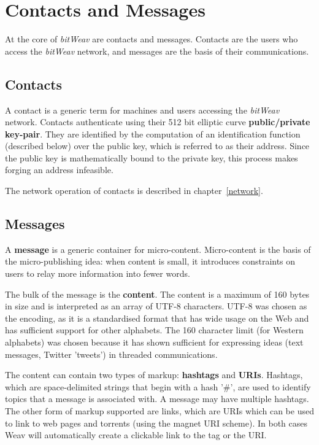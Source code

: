 \documentclass[10pt,a4paper,onecolumn]{article}
\begin{document}
\section{Contacts and Messages}
\label{ContactsAndMessages}
At the core of \textit{bitWeav} are contacts and messages. Contacts are the users who access the \textit{bitWeav} network, and messages are the basis of their communications.

\subsection*{Contacts}
A contact is a generic term for machines and users accessing the \textit{bitWeav} network. Contacts authenticate using their 512 bit elliptic curve \textbf{public/private key-pair}. They are identified by the computation of an identification function (described below) over the public key, which is referred to as their address. Since the public key is mathematically bound to the private key, this process makes forging an address infeasible.

The network operation of contacts is described in chapter~\ref{network}.

\subsection*{Messages}
A \textbf{message} is a generic container for micro-content. Micro-content is the basis of the micro-publishing idea: when content is small, it introduces constraints on users to relay more information into fewer words.

The bulk of the message is the \textbf{content}. The content is a maximum of 160 bytes in size and is interpreted as an array of UTF-8 characters. UTF-8 was chosen as the encoding, as it is a standardised format that has wide usage on the Web and has sufficient support for other alphabets. The 160 character limit (for Western alphabets) was chosen because it has shown sufficient for expressing ideas (text messages, Twitter 'tweets') in threaded communications. 

The content can contain two types of markup: \textbf{hashtags} and \textbf{URIs}. Hashtags, which are space-delimited strings that begin with a hash '\#', are used to identify topics that a message is associated with. A message may have multiple hashtags. The other form of markup supported are links, which are URIs which can be used to link to web pages and torrents (using the magnet URI scheme). In both cases Weav will automatically create a clickable link to the tag or the URI.
\end{document}
